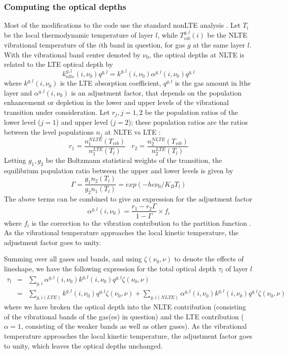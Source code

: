 \documentclass[12pt]{article}
\begin{document}
{{{{\subsubsection{Computing the optical depths}
Most of the modifications to the code use the standard nonLTE analysis 
\cite{edw:93,edw:98,lop:01,kopra}. Let $T_{l}$ be the local thermodynamic
temperature of layer $l$, while $T_{vib}^{g,l}(i)$ be the NLTE vibrational 
temperature of the $i$th band in question, for gas $g$ at the same layer $l$.
With the vibrational band center denoted by $\nu_{0}$, the optical depths 
at NLTE is related to the LTE optical depth by \\
\[
k_{nlte}^{g,l}(i,\nu_0) q^{g,l} = 
      k^{g,l}(i,\nu_0) \alpha^{g,l}(i,\nu_0) q^{g,l}
\]
where $k^{g,l}(i,\nu_0)$ is the LTE absorption coefficient, $q^{g,l}$ is the
gas amount in lthe layer and $\alpha^{g,l}(i,\nu_0)$ is an
adjustment factor, that depends on the population enhancememt or depletion in
the lower and upper levels of the vibrational transition under consideration.
Let $r_{j}, j = 1,2$ be the population ratios of the lower level ($j=1$) and
upper level ($j=2$); these population ratios are the ratios between the 
level populations $n_{j}$ at NLTE vs LTE : 
\[
r_{1} = \frac{n_{1}^{NLTE}(T_{vib})}{n_{1}^{LTE}(T_{l})} \;\;\;
r_{2} = \frac{n_{2}^{NLTE}(T_{vib})}{n_{2}^{LTE}(T_{l})}
\]
Letting $g_1,g_2$ be the Boltzmann statistical weights of the transition, the
equilibrium population ratio between the upper and lower levels is given by
\cite{edw:93,lop:01}
\[
\Gamma = \frac{g_{1}n_{2}(T_{l})}{g_{2}n_{1}(T_{l})} = 
exp(-hc\nu_{0}/K_{B}T_{l})
\]
The above terms can be combined to \cite{edw:93,lop:01} give an expression for
the adjustment factor
\[
\alpha^{g,l}(i,\nu_0) = \frac{r_1 - r_2 \Gamma}{1 - \Gamma} \times f_{i}
\]
where $f_{i}$ is the correction to the vibration contribution to the partition 
function \cite{edw:93,edw:98}. As the vibrational temperature approaches the
local kinetic temperature, the adjustment factor goes to unity.

Summing over all gases and bands, and using $\zeta(\nu_{0},\nu)$ to denote
the effects of lineshape, we have the following expression for the 
total optical depth $\tau_{l}$ of layer $l$
\begin{eqnarray*}
\tau_{l} & = & 
 \sum_{g,i} \alpha^{g,l}(i,\nu_0) k^{g,l}(i,\nu_0) q^{g,l} \zeta(\nu_{0},\nu)\\
   & =  & \sum_{g,i(LTE)} k^{g,l}(i,\nu_0) q^{g,l} \zeta(\nu_{0},\nu) + 
    \sum_{g,i(NLTE)} \alpha^{g,l}(i,\nu_0) k^{g,l}(i,\nu_0) q^{g,l} 
                 \zeta(\nu_{0},\nu)
\end{eqnarray*}
where we have broken the optical depth into the NLTE contribution (consisting 
of the vibrational bands of the gas(es) in question) and the LTE contribution 
($\alpha = 1$, consisting of the weaker bands as well as other gases). 
As the vibrational temperature approaches the local kinetic temperature, the 
adjustment factor goes to unity, which leaves the optical depths unchanged.

}}}}
\end{document}
